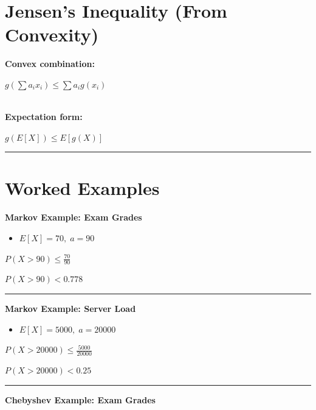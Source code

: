 \documentclass[12pt]{article}
\begin{document}
\section*{Jensen’s Inequality (From Convexity)}

\textbf{Convex combination:}

\begin{center}
    $g\left(\sum a_i x_i\right) \leq \sum a_i g(x_i)$
\end{center}
\\
\textbf{Expectation form:}

\begin{center}
    $g(E[X]) \leq E[g(X)]$
\end{center}
\noindent\rule{\textwidth}{0.4pt}
\section*{Worked Examples}
\textbf{Markov Example: Exam Grades}

\begin{itemize}
    \item $E[X] = 70, \; a = 90$
\end{itemize}

\begin{center}
    $P(X > 90) \leq \frac{70}{90}$
\end{center}

\begin{center}
    $P(X > 90) < 0.778$
\end{center}

\vspace{1em}
\hrule
\vspace{1em}

\textbf{Markov Example: Server Load}

\begin{itemize}
    \item $E[X] = 5000, \; a = 20000$
\end{itemize}

\begin{center}
    $P(X > 20000) \leq \frac{5000}{20000}$
\end{center}

\begin{center}
    $P(X > 20000) < 0.25$
\end{center}

\vspace{1em}
\hrule
\vspace{1em}

\textbf{Chebyshev Example: Exam Grades}
\end{document}
